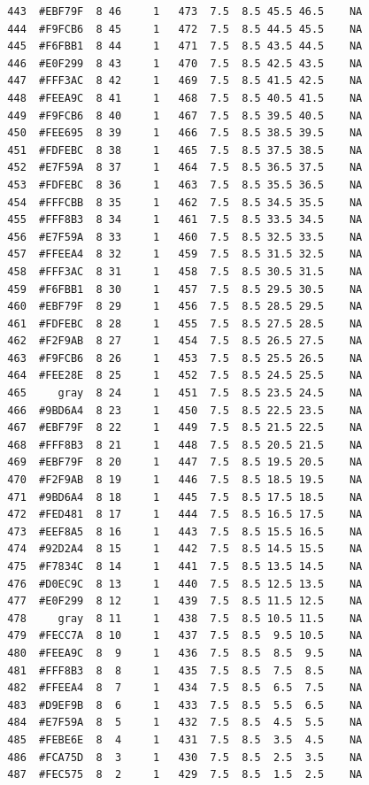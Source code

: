 \documentclass[12pt,twoside]{reedthesis}
\begin{document}
\begin{verbatim}
  443  #EBF79F  8 46     1   473  7.5  8.5 45.5 46.5    NA
  444  #F9FCB6  8 45     1   472  7.5  8.5 44.5 45.5    NA
  445  #F6FBB1  8 44     1   471  7.5  8.5 43.5 44.5    NA
  446  #E0F299  8 43     1   470  7.5  8.5 42.5 43.5    NA
  447  #FFF3AC  8 42     1   469  7.5  8.5 41.5 42.5    NA
  448  #FEEA9C  8 41     1   468  7.5  8.5 40.5 41.5    NA
  449  #F9FCB6  8 40     1   467  7.5  8.5 39.5 40.5    NA
  450  #FEE695  8 39     1   466  7.5  8.5 38.5 39.5    NA
  451  #FDFEBC  8 38     1   465  7.5  8.5 37.5 38.5    NA
  452  #E7F59A  8 37     1   464  7.5  8.5 36.5 37.5    NA
  453  #FDFEBC  8 36     1   463  7.5  8.5 35.5 36.5    NA
  454  #FFFCBB  8 35     1   462  7.5  8.5 34.5 35.5    NA
  455  #FFF8B3  8 34     1   461  7.5  8.5 33.5 34.5    NA
  456  #E7F59A  8 33     1   460  7.5  8.5 32.5 33.5    NA
  457  #FFEEA4  8 32     1   459  7.5  8.5 31.5 32.5    NA
  458  #FFF3AC  8 31     1   458  7.5  8.5 30.5 31.5    NA
  459  #F6FBB1  8 30     1   457  7.5  8.5 29.5 30.5    NA
  460  #EBF79F  8 29     1   456  7.5  8.5 28.5 29.5    NA
  461  #FDFEBC  8 28     1   455  7.5  8.5 27.5 28.5    NA
  462  #F2F9AB  8 27     1   454  7.5  8.5 26.5 27.5    NA
  463  #F9FCB6  8 26     1   453  7.5  8.5 25.5 26.5    NA
  464  #FEE28E  8 25     1   452  7.5  8.5 24.5 25.5    NA
  465     gray  8 24     1   451  7.5  8.5 23.5 24.5    NA
  466  #9BD6A4  8 23     1   450  7.5  8.5 22.5 23.5    NA
  467  #EBF79F  8 22     1   449  7.5  8.5 21.5 22.5    NA
  468  #FFF8B3  8 21     1   448  7.5  8.5 20.5 21.5    NA
  469  #EBF79F  8 20     1   447  7.5  8.5 19.5 20.5    NA
  470  #F2F9AB  8 19     1   446  7.5  8.5 18.5 19.5    NA
  471  #9BD6A4  8 18     1   445  7.5  8.5 17.5 18.5    NA
  472  #FED481  8 17     1   444  7.5  8.5 16.5 17.5    NA
  473  #EEF8A5  8 16     1   443  7.5  8.5 15.5 16.5    NA
  474  #92D2A4  8 15     1   442  7.5  8.5 14.5 15.5    NA
  475  #F7834C  8 14     1   441  7.5  8.5 13.5 14.5    NA
  476  #D0EC9C  8 13     1   440  7.5  8.5 12.5 13.5    NA
  477  #E0F299  8 12     1   439  7.5  8.5 11.5 12.5    NA
  478     gray  8 11     1   438  7.5  8.5 10.5 11.5    NA
  479  #FECC7A  8 10     1   437  7.5  8.5  9.5 10.5    NA
  480  #FEEA9C  8  9     1   436  7.5  8.5  8.5  9.5    NA
  481  #FFF8B3  8  8     1   435  7.5  8.5  7.5  8.5    NA
  482  #FFEEA4  8  7     1   434  7.5  8.5  6.5  7.5    NA
  483  #D9EF9B  8  6     1   433  7.5  8.5  5.5  6.5    NA
  484  #E7F59A  8  5     1   432  7.5  8.5  4.5  5.5    NA
  485  #FEBE6E  8  4     1   431  7.5  8.5  3.5  4.5    NA
  486  #FCA75D  8  3     1   430  7.5  8.5  2.5  3.5    NA
  487  #FEC575  8  2     1   429  7.5  8.5  1.5  2.5    NA

\end{verbatim}
\end{document}
